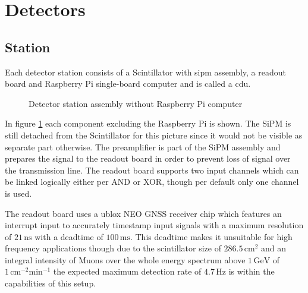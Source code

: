 \documentclass[abstract,toc,los,lof,english,10pt,glossary,acronyms]{jluthesis}
\begin{document}
\section{Detectors}
\subsection{Station}
Each detector station consists of a Scintillator with \acrshort{sipm} assembly, a readout board and Raspberry Pi single-board computer and is called a \acrfull{cdu}.
\begin{figure}[H]
	\centering
	\caption{Detector station assembly without Raspberry Pi computer}
	\label{fig:station_assembly}
\end{figure}
In figure \ref{fig:station_assembly} each component excluding the Raspberry Pi is shown. The SiPM is still detached from the Scintillator for this picture since it would not be visible as separate part otherwise. The preamplifier is part of the SiPM assembly and prepares the signal to the readout board in order to prevent loss of signal over the transmission line. The readout board supports two input channels which can be linked logically either per AND or XOR, though per default only one channel is used.

The readout board uses a ublox NEO GNSS receiver chip which features an interrupt input to accurately timestamp input signals with a maximum resolution of $21\,\text{ns}$ \cite{ublox-datasheet} with a deadtime of $100\,\text{ms}$.
This deadtime makes it unsuitable for high frequency applications though due to the scintillator size of $286.5\,\text{cm}^2$ and an integral intensity of Muons over the whole energy spectrum above $1\,\text{GeV}$ of $1\,\text{cm}^{-2}\text{min}^{-1}$\cite[512]{10.1093/ptep/ptaa104} the expected maximum detection rate of $4.7\,\text{Hz}$ is within the capabilities of this setup. \\
\end{document}
